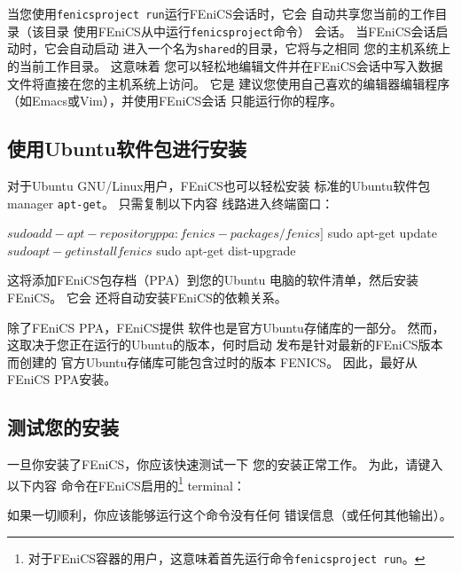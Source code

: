 \begin{notice}[与FEniCS容器共享文件]
当您使用\texttt{fenicsproject run}运行FEniCS会话时，它会
自动共享您当前的工作目录（该目录
使用FEniCS从中运行\texttt{fenicsproject}命令）
会话。 当FEniCS会话启动时，它会自动启动
进入一个名为\texttt{shared}的目录，它将与之相同
您的主机系统上的当前工作目录。 这意味着
您可以轻松地编辑文件并在FEniCS会话中写入数据
文件将直接在您的主机系统上访问。 它是
建议您使用自己喜欢的编辑器编辑程序
（如Emacs或Vim），并使用FEniCS会话
只能运行你的程序。
\end{notice}


\subsection{使用Ubuntu软件包进行安装}
对于Ubuntu GNU/Linux用户，FEniCS也可以轻松安装
标准的Ubuntu软件包manager \texttt{apt-get}。 只需复制以下内容
线路进入终端窗口：


\begin{bash}
$ sudo add-apt-repository ppa:fenics-packages/fenics]
$ sudo apt-get update
$ sudo apt-get install fenics
$ sudo apt-get dist-upgrade
\end{bash}

这将添加FEniCS包存档（PPA）到您的Ubuntu
电脑的软件清单，然后安装FEniCS。 它会
还将自动安装FEniCS的依赖关系。

\begin{notice}[注意旧包装！]
除了FEniCS PPA，FEniCS提供
软件也是官方Ubuntu存储库的一部分。 然而，
这取决于您正在运行的Ubuntu的版本，何时启动
发布是针对最新的FEniCS版本而创建的
官方Ubuntu存储库可能包含过时的版本
FENICS。 因此，最好从FEniCS PPA安装。
\end{notice}

\subsection{测试您的安装}
一旦你安装了FEniCS，你应该快速测试一下
您的安装正常工作。 为此，请键入以下内容
命令在FEniCS启用的\footnote{对于FEniCS容器的用户，这意味着首先运行命令\texttt{fenicsproject run}。} terminal：


如果一切顺利，你应该能够运行这个命令没有任何
错误信息（或任何其他输出）。

